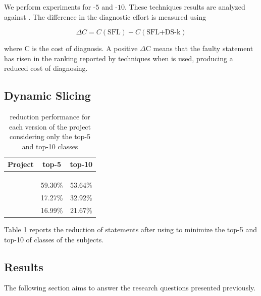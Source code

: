 \documentclass{article}
\begin{document}
We perform experiments for \comb{}-$5$ and \comb{}-$10$. These techniques results are analyzed against \sfl{}. The difference in the diagnostic effort is measured
using

\begin{equation}
    \Delta{}C = C(\textrm{SFL}) - C(\textrm{SFL+DS-k})
\end{equation}

where C is the cost of diagnosis. 
A positive $\Delta$C means that the faulty statement has risen in
the ranking reported by \sfl{} techniques when \ds{} is used,
producing a reduced cost of diagnosing.

\subsection{Dynamic Slicing}

\begin{table}[h]
	\centering
	\setlength{\tabcolsep}{4pt}
	\begin{tabular}{lcc}
		\toprule
		Project             &  top-5  & top-10 \\ 
		\midrule
		
        \lang{}            &  & \\ 	
        \cmath{}           &  & \\
        \closure{}          &  & \\	
		\chart{}			& 59.30\% & 53.64\% \\ 	
        \jtime{}            & 17.27\% & 32.92\%\\	
        \mockito{}          & 16.99\% & 21.67\%\\	
			
		\bottomrule
	\end{tabular}
	\caption {\ds{} reduction performance for each version of the \chart{} project considering only the top-5 and top-10 classes}
	\label{tab:red}
\end{table}
\normalsize

Table \ref{tab:red} reports the reduction of statements after using \ds{} to minimize the top-5 and top-10 of classes of the subjects. 


\subsection{Results}

The following section aims to answer the research questions presented previously.
\end{document}
